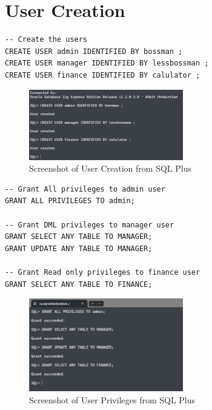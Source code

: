 \section{User Creation}
\hrulefill

\begin{lstlisting}[caption={User Creation}, label={lst:user_cration}]
-- Create the users
CREATE USER admin IDENTIFIED BY bossman ;
CREATE USER manager IDENTIFIED BY lessbossman ;
CREATE USER finance IDENTIFIED BY calulator ;
\end{lstlisting}
\begin{figure}[H]
    \centering
    \includegraphics[width=0.6\textwidth]{images/user/creation.png}
    \caption{Screenshot of User Creation from SQL Plus}
\end{figure}

\begin{lstlisting}[caption={User Creation}, label={lst:user_cration}]
-- Grant All privileges to admin user
GRANT ALL PRIVILEGES TO admin;

-- Grant DML privileges to manager user
GRANT SELECT ANY TABLE TO MANAGER;
GRANT UPDATE ANY TABLE TO MANAGER;

-- Grant Read only privileges to finance user
GRANT SELECT ANY TABLE TO FINANCE;
\end{lstlisting}

\begin{figure}[H]
    \centering
    \includegraphics[width=0.6\textwidth]{images/user/prev.png}
    \caption{Screenshot of User Privileges from SQL Plus}
\end{figure}

\clearpage
